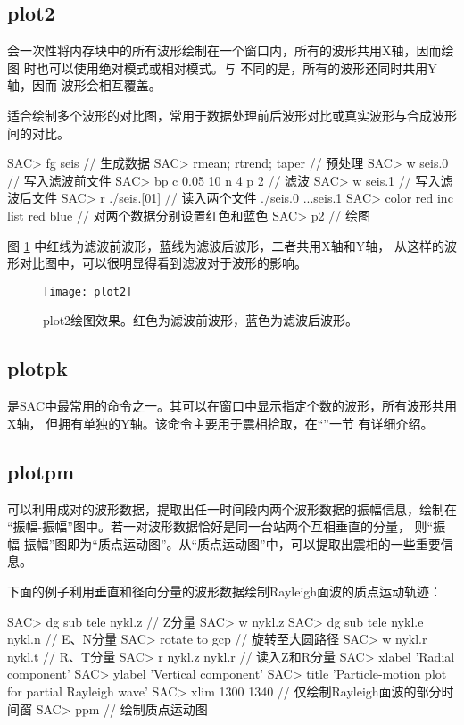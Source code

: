 \subsection{plot2}
 会一次性将内存块中的所有波形绘制在一个窗口内，所有的波形共用X轴，因而绘图
时也可以使用绝对模式或相对模式。与  不同的是，所有的波形还同时共用Y轴，因而
波形会相互覆盖。

 适合绘制多个波形的对比图，常用于数据处理前后波形对比或真实波形与合成波形间的对比。
\begin{SACCode}
SAC> fg seis                     // 生成数据
SAC> rmean; rtrend; taper        // 预处理
SAC> w seis.0                    // 写入滤波前文件
SAC> bp c 0.05 10 n 4 p 2        // 滤波
SAC> w seis.1                    // 写入滤波后文件
SAC> r ./seis.[01]               // 读入两个文件
./seis.0 ...seis.1
SAC> color red inc list red blue // 对两个数据分别设置红色和蓝色
SAC> p2                          // 绘图
\end{SACCode}
图 \ref{fig:plot2} 中红线为滤波前波形，蓝线为滤波后波形，二者共用X轴和Y轴，
从这样的波形对比图中，可以很明显得看到滤波对于波形的影响。

\begin{figure}[H]
\centering
\texttt{[image: plot2]}
\caption[plot2绘图效果]{plot2绘图效果。红色为滤波前波形，蓝色为滤波后波形。}
\label{fig:plot2}
\end{figure}

\subsection{plotpk}
 是SAC中最常用的命令之一。其可以在窗口中显示指定个数的波形，所有波形共用X轴，
但拥有单独的Y轴。该命令主要用于震相拾取，在``''一节
有详细介绍。

\subsection{plotpm}
 可以利用成对的波形数据，提取出任一时间段内两个波形数据的振幅信息，绘制在
``振幅-振幅''图中。若一对波形数据恰好是同一台站两个互相垂直的分量，
则``振幅-振幅''图即为``质点运动图''。从``质点运动图''中，可以提取出震相的一些重要信息。

下面的例子利用垂直和径向分量的波形数据绘制Rayleigh面波的质点运动轨迹：
\begin{SACCode}
SAC> dg sub tele nykl.z             // Z分量
SAC> w nykl.z
SAC> dg sub tele nykl.e nykl.n      // E、N分量
SAC> rotate to gcp                  // 旋转至大圆路径
SAC> w nykl.r nykl.t                // R、T分量
SAC> r nykl.z nykl.r                // 读入Z和R分量
SAC> xlabel 'Radial component'
SAC> ylabel 'Vertical component'
SAC> title 'Particle-motion plot for partial Rayleigh wave'
SAC> xlim 1300 1340                 // 仅绘制Rayleigh面波的部分时间窗
SAC> ppm                            // 绘制质点运动图
\end{SACCode}

